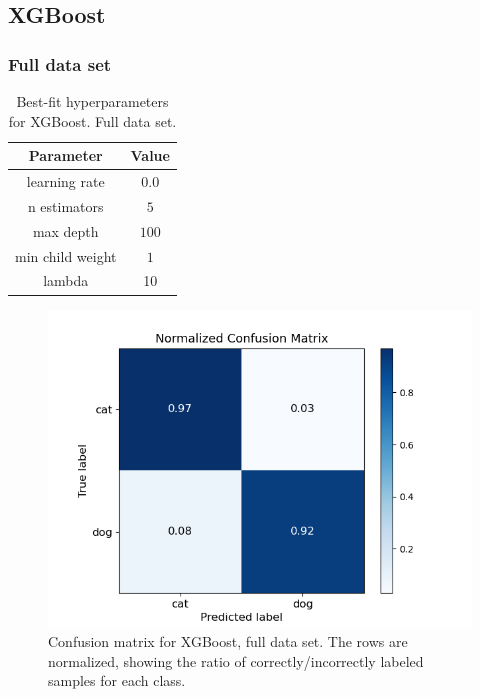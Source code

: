 \documentclass[a4paper]{article}
\begin{document}
\subsection{XGBoost}
\subsubsection{Full data set}
\begin{table}[H]
  \centering
  \caption{Best-fit hyperparameters for XGBoost. Full data set.}
  \label{tab:best_fit_xgboost_nonpca}
  \begin{tabular}{c|c}
    \hline\hline
    Parameter & Value\\\hline
    learning rate  & $0.0$\\
    n estimators &  $5$\\
    max depth &  $100$\\
    min child weight & $1$ \\
    lambda & 10
    \end{tabular}
\end{table}

\begin{figure}[H]
	\centering
	\includegraphics[scale=0.6]{../figures/xgboost/confusion_matrix_nbins200_pca0_seed4155_ts0.20.png}
	\caption{Confusion matrix for XGBoost, full data set. The rows are normalized, showing the ratio of correctly/incorrectly labeled samples for each class.}
	\label{fig:xgboost_confusion_nonpca}
\end{figure}
\end{document}
